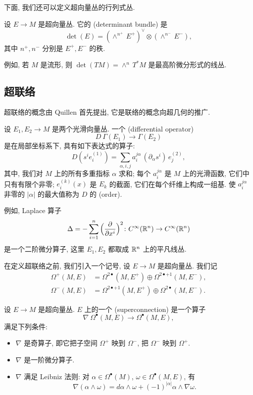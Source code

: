 下面, 我们还可以定义超向量丛的行列式丛.

\begin{definition}
    设 $E \to M$ 是超向量丛. 它的 (determinant bundle) 是
    \[ \det (E) = (\wedge^{n^+} \, E^+)^\vee \otimes (\wedge^{n^-} \, E^-), \]
    其中 $n^+, n^-$ 分别是 $E^+, E^-$ 的秩.
\end{definition}

例如, 若 $M$ 是流形, 则 $\det (TM) = \wedge^n \, T^* M$
是最高阶微分形式的线丛.


\subsection{超联络}

超联络的概念由 Quillen \cite{quillen-superconnection} 首先提出,
它是联络的概念向超几何的推广.

\begin{definition}
    设 $E_1, E_2 \to M$ 是两个光滑向量丛. 一个 (differential operator)
    \[ D \: \Gamma (E_1) \to \Gamma (E_2) \]
    是在局部坐标系下, 具有如下表达式的算子:
    \[ D (s^i e_i^{(1)}) = \sum_{\alpha, i, j} 
        a_i^{j \alpha} \, ( \partial_{\alpha} s^i ) \, e_j^{(2)}, \]
    其中, 我们对 $M$ 上的所有多重指标 $\alpha$ 求和;
    每个 $a_i^{j \alpha}$ 是 $M$ 上的光滑函数, 它们中只有有限个非零;
    $e_i^{(k)} (x)$ 是 $E_k$ 的截面, 它们在每个纤维上构成一组基.
    使 $a_i^{j \alpha}$ 非零的 $|\alpha|$ 的最大值称为 $D$ 的 (order).
\end{definition}

例如, Laplace 算子 
\[ \Delta = -\sum_{i=1}^n {} \Bigl( \frac {\partial} {\partial x^i} \Bigr)^2
    \colon C^\infty (\mathbb{R}^n) \to C^\infty (\mathbb{R}^n) \]
是一个二阶微分算子, 这里 $E_1, E_2$ 都取成 $\mathbb{R}^n$ 上的平凡线丛.

在定义超联络之前, 我们引入一个记号,
设 $E \to M$ 是超向量丛. 我们记
\begin{align*}
    \Omega^+ (M, E) &= \Omega^{2\bullet} (M, E^+) 
        \oplus \Omega^{2\bullet + 1} (M, E^-), \\
    \Omega^- (M, E) &= \Omega^{2\bullet + 1} (M, E^+) 
        \oplus \Omega^{2\bullet} (M, E^-).
\end{align*}

\begin{definition}
    设 $E \to M$ 是超向量丛. $E$ 上的一个 (superconnection) 是一个算子
    \[ \nabla \: \Omega^\bullet (M, E) \to \Omega^\bullet (M, E), \]
    满足下列条件:
    \begin{itemize}
        \item
            $\nabla$ 是奇算子, 即它把子空间 $\Omega^+$ 映到 $\Omega^-$, 
            把 $\Omega^-$ 映到 $\Omega^+$.
        \item
            $\nabla$ 是一阶微分算子.
        \item
            $\nabla$ 满足 Leibniz 法则: 
            对 $\alpha \in \Omega^\bullet (M)$, $\omega \in \Omega^\bullet (M, E)$, 有
            \[ \nabla (\alpha \wedge \omega)
                = d \alpha \wedge \omega + (-1)^{|\alpha|} \alpha \wedge \nabla \omega. \]
    \end{itemize}
\end{definition}

